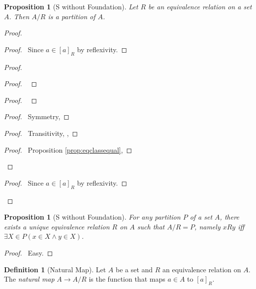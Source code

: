 \documentclass{book}
\let\qed\relax
\newtheorem{prop}[ax]{Proposition}
\theoremstyle{definition}
\newtheorem{df}[ax]{Definition}
\begin{document}
\begin{prop}[S without Foundation]
Let $R$ be an equivalence relation on a set $A$. Then $A/R$ is a partition of $A$.
\end{prop}

\begin{proof}
\pf
{}
\begin{proof}
	\pf\ Since $a \in [a]_R$ by reflexivity.
\end{proof}
\begin{proof}
	\begin{proof}
		\pf\ 
	\end{proof}
	\begin{proof}
		\pf\ 
	\end{proof}
	\begin{proof}
		\pf\ Symmetry, 
	\end{proof}
	\begin{proof}
		\pf\ Transitivity, , 
	\end{proof}
	\begin{proof}
		\pf\ Proposition \ref{prop:eqclassequal}, 
	\end{proof}
\end{proof}
\begin{proof}
	\pf\ Since $a \in [a]_R$ by reflexivity.
\end{proof}
\qed
\end{proof}

\begin{prop}[S without Foundation]
For any partition $P$ of a set $A$, there exists a unique equivalence relation $R$ on $A$ such that $A/R = P$, namely $xRy$ iff $\exists X \in P(x \in X \wedge y \in X)$.
\end{prop}

\begin{proof}
\pf\ Easy. \qed
\end{proof}

\begin{df}[Natural Map]
Let $A$ be a set and $R$ an equivalence relation on $A$. The \emph{natural map} $A \rightarrow A / R$ is the function that maps $a \in A$ to $[a]_R$.
\end{df}
\end{document}
